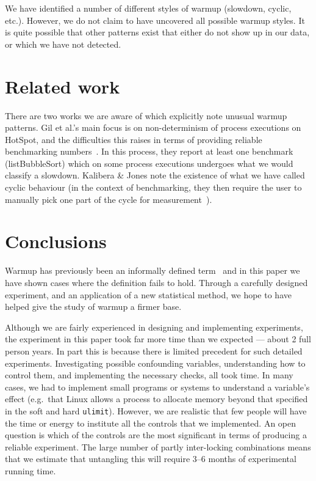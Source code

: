 \documentclass[preprint,numbers,10pt]{sigplanconf}
\newcommand{\kalibera}{Kalibera \& Jones\xspace}
\begin{document}
We have identified a number of different styles of warmup (slowdown, cyclic,
etc.). However, we do not claim to have uncovered all possible warmup styles. It
is quite possible that other patterns exist that either do not show up in our
data, or which we have not detected.


\section{Related work}

There are two works we are aware of which explicitly note unusual warmup
patterns. Gil et al.'s main focus is on non-determinism of process executions on
HotSpot, and the difficulties this raises in terms of providing reliable
benchmarking numbers~\cite{gil11microbenchmark}. In this process, they report at
least one benchmark (listBubbleSort) which on some process executions undergoes what we
would classify a slowdown. \kalibera note the
existence of what we have called cyclic behaviour (in the context of benchmarking,
they then require the user to
manually pick one part of the cycle for measurement~\cite{kalibera13rigorous}).


\section{Conclusions}
\label{sec:conclusion}

Warmup has previously been an informally defined term~\cite{seaton15phd} and in this
paper we have shown cases where the definition fails to hold. Through a carefully
designed experiment, and an application of a new statistical method, we hope
to have helped give the study of warmup a firmer base.

Although we are fairly experienced in designing and implementing
experiments, the experiment in this paper took far more time than we expected
--- about 2 full person years. In part this is because there is limited precedent for such detailed
experiments. Investigating possible confounding variables, understanding how to
control them, and implementing the necessary checks, all took time. In many
cases, we had to implement small programs or systems to understand a variable's
effect (e.g.~that Linux allows a process to allocate memory beyond that
specified in the soft and hard \texttt{ulimit}). However, we are realistic that
few people will have the time or energy to institute all the controls that we
implemented. An open question is which of the controls are the most significant
in terms of producing a reliable experiment. The large number of partly
inter-locking combinations means that we estimate that untangling this will
require 3--6 months of experimental running time.
\end{document}
